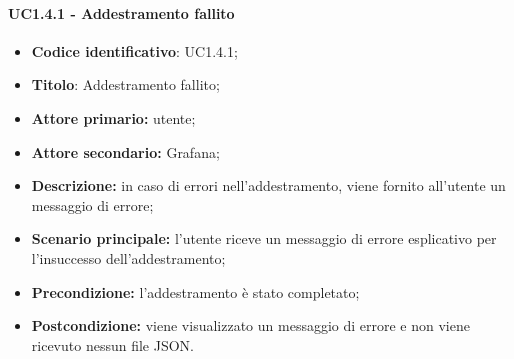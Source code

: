 \documentclass{article}
\begin{document}
	\paragraph{UC1.4.1 - Addestramento fallito}
	\begin{itemize}
		\item \textbf{Codice identificativo}: UC1.4.1;
		\item \textbf{Titolo}: Addestramento fallito;
		\item \textbf{Attore primario:} utente;
		\item \textbf{Attore secondario:} Grafana\glo;
		\item \textbf{Descrizione:} in caso di errori nell'addestramento, viene fornito all'utente un messaggio di errore;
		\item \textbf{Scenario principale:} l'utente riceve un messaggio di errore esplicativo per l'insuccesso dell'addestramento;
		\item \textbf{Precondizione:} l'addestramento è stato completato;
		\item \textbf{Postcondizione:} viene visualizzato un messaggio di errore e non viene ricevuto nessun file JSON.
	\end{itemize}
\end{document}
